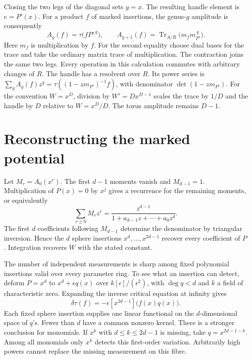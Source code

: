 \documentclass[11pt]{article}
\newcommand{\Tr}{\operatorname{Tr}}
\begin{document}
Closing the two legs of the diagonal sets \(y=x\). The resulting
handle element is \(e=P'(x)\). For a product \(f\) of marked
insertions, the genus-\(g\) amplitude is consequently
\begin{equation}
 A_g(f)=\tau\bigl(fP'^{\,g}\bigr),\qquad
 A_{g+1}(f)=\Tr_{A/R}\bigl(m_f m_{P'}^{\,g}\bigr) .
 \label{eq:handle}
\end{equation}
Here \(m_f\) is multiplication by \(f\). For the second equality
choose dual bases for the trace and take the ordinary matrix
trace of multiplication. The contraction joins the same two legs.
Every operation in this calculation commutes with arbitrary changes
of \(R\). The handle has a resolvent over \(R\). Its power series
is \(\sum_g A_g(f)z^g=\tau((1-zm_{P'})^{-1}f)\),
with denominator \(\det(1-zm_{P'})\).
For the convention \(W=x^{D}\), division by \(W'=Dx^{D-1}\)
scales the trace by \(1/D\) and the handle by \(D\) relative to
\(W=x^{D}/D\). The torus amplitude remains \(D-1\).

\section{Reconstructing the marked potential}

Let \(M_r=A_0(x^r)\). The first \(d-1\) moments vanish and
\(M_{d-1}=1\). Multiplication of \(P(x)=0\) by \(x^j\) gives a
recurrence for the remaining moments, or equivalently
\begin{equation}
 \sum_{r\ge0} M_r z^r
  =\frac{z^{d-1}}{1+a_{d-1}z+\cdots+a_0z^d}.
 \label{eq:moments}
\end{equation}
The first \(d\) coefficients following \(M_{d-1}\) determine the
denominator by triangular inversion. Hence the \(d\) sphere
insertions \(x^d,\ldots,x^{2d-1}\) recover every coefficient of \(P\).
Integration recovers \(W\) with the stated constant.

The number of independent measurements is sharp among fixed
polynomial insertions valid over every parameter ring. To see what
an insertion can detect, deform \(P=x^d\) to \(x^d+\epsilon q(x)\)
over \(k[\epsilon]/(\epsilon^2)\), with \(\deg q<d\) and \(k\) a
field of characteristic zero. Expanding the inverse critical equation
at infinity gives
\begin{equation}
 \delta\tau(f)=-\epsilon[x^{2d-1}]\bigl(f(x)q(x)\bigr).
 \label{eq:tangent}
\end{equation}
Each fixed sphere insertion supplies one linear functional on the
\(d\)-dimensional space of \(q\)'s. Fewer than \(d\) have a common
nonzero kernel. There is a stronger conclusion for monomials. If
\(x^k\) with \(d\le k\le 2d-1\) is missing, take \(q=x^{2d-1-k}\).
Among all monomials only \(x^k\) detects this first-order variation.
Arbitrarily high powers cannot replace the missing measurement on
this fibre.
\end{document}
